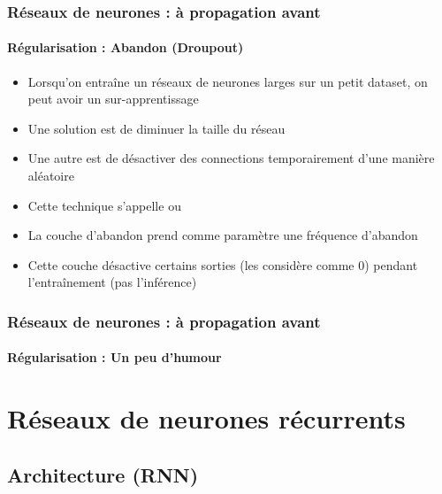 \documentclass[xcolor=table]{beamer}
\begin{document}
\begin{frame}
\frametitle{Réseaux de neurones : à propagation avant}
\framesubtitle{Régularisation : Abandon (Droupout)}

\begin{itemize}
	\item Lorsqu'on entraîne un réseaux de neurones larges sur un petit dataset, on peut avoir un sur-apprentissage
	\item Une solution est de diminuer la taille du réseau 
	\item Une autre est de désactiver des connections temporairement d'une manière aléatoire
	\item Cette technique s'appelle  ou 
	\item La couche d'abandon prend comme paramètre une fréquence d'abandon
	\item Cette couche désactive certains sorties (les considère comme 0) pendant l'entraînement (pas l'inférence)
\end{itemize}

\end{frame}


\begin{frame}
\frametitle{Réseaux de neurones : à propagation avant}
\framesubtitle{Régularisation : Un peu d'humour}


\end{frame}


\section{Réseaux de neurones récurrents}


\subsection{Architecture (RNN)}
\end{document}
